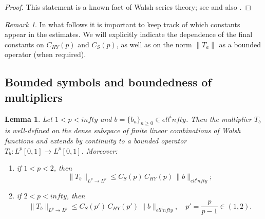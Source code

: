 \documentclass[a4paper,12pt]{article}
\newtheorem{lemma}[theorem]{Lemma}
\theoremstyle{definition}
\theoremstyle{remark}
\newtheorem{remark}[theorem]{Remark}
\theoremstyle{definition}
\newcommand{\Lp}{L^p[0,1]}
\def\infty{infty}%
\def\ell{ell}%
\begin{document}
\begin{proof}
This statement is a known fact of Walsh series theory;
see \cite[Ch.~II, section on Walsh transform and synthesis]{GolubovEfimovSkvortsov1991}
and also \cite{SchippWadeSimon1990}.
\end{proof}

\begin{remark}
In what follows it is important to keep track of which constants appear in the estimates.
We will explicitly indicate the dependence of the final constants on $C_{HY}(p)$ and $C_S(p)$,
as well as on the norm $\|T_a\|$ as a bounded operator (when required).
\end{remark}

\subsection{Bounded symbols and boundedness of multipliers}
\label{subsec:linfty}

\begin{lemma}
\label{lem:linftyMultiplier}
Let $1<p<\infty$ and $b=\{b_n\}_{n\ge0}\in \ell^\infty$.
Then the multiplier $T_b$ is well-defined on the dense subspace
of finite linear combinations of Walsh functions and extends by continuity
to a bounded operator $T_b:\Lp\to\Lp$.
Moreover:
\begin{enumerate}
\item[(a)] if $1<p<2$, then
\[
\|T_b\|_{L^p\to L^p}\le C_S(p)\,C_{HY}(p)\,\|b\|_{\ell^\infty};
\]
\item[(b)] if $2<p<\infty$, then
\[
\|T_b\|_{L^p\to L^p}\le C_S(p')\,C_{HY}(p')\,\|b\|_{\ell^\infty},
\quad p'=\frac{p}{p-1}\in(1,2).
\]
\end{enumerate}
\end{lemma}
\end{document}
